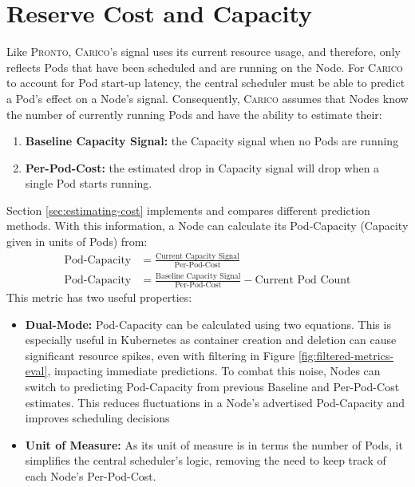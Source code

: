 \section{Reserve Cost and Capacity}
\label{sec:spazio-cost-capacity}
Like \textsc{Pronto}, \textsc{Carico}'s signal uses its current resource usage, and therefore, only
reflects Pods that have been scheduled and are running on the Node. For
\textsc{Carico} to account for Pod start-up latency, the central scheduler must be able
to predict a Pod's effect on a Node's signal. Consequently, \textsc{Carico}
assumes that Nodes know the number of currently running Pods and have the
ability to estimate their:
\begin{enumerate}
    \item \textbf{Baseline Capacity Signal:} the Capacity signal when no Pods
        are running
    \item \textbf{Per-Pod-Cost:} the estimated drop in Capacity signal will drop
        when a single Pod starts running.
\end{enumerate}
Section \ref{sec:estimating-cost} implements and compares different prediction
methods. With this information, a Node can calculate its Pod-Capacity (Capacity
given in units of Pods) from:
\begin{align}
    \text{Pod-Capacity} &= \frac{\text{Current Capacity Signal}}{\text{Per-Pod-Cost}} \\
    \text{Pod-Capacity} &= \frac{\text{Baseline Capacity Signal}}{\text{Per-Pod-Cost}}
    - \text{Current Pod Count}
\end{align}
This metric has two useful properties:
\begin{itemize}
    \item \textbf{Dual-Mode:} Pod-Capacity can be calculated
        using two equations. This is especially useful in Kubernetes as
        container creation and deletion can cause significant resource spikes,
        even with filtering in Figure \ref{fig:filtered-metrics-eval}, impacting
        immediate predictions.
        To combat this noise, Nodes can switch to predicting Pod-Capacity from
        previous Baseline and Per-Pod-Cost estimates. This reduces fluctuations
        in a Node's advertised Pod-Capacity and improves scheduling decisions
    \item \textbf{Unit of Measure:} As its unit of measure is in terms
        the number of Pods, it simplifies the central scheduler's logic,
        removing the need to keep track of each Node's Per-Pod-Cost.
\end{itemize}


